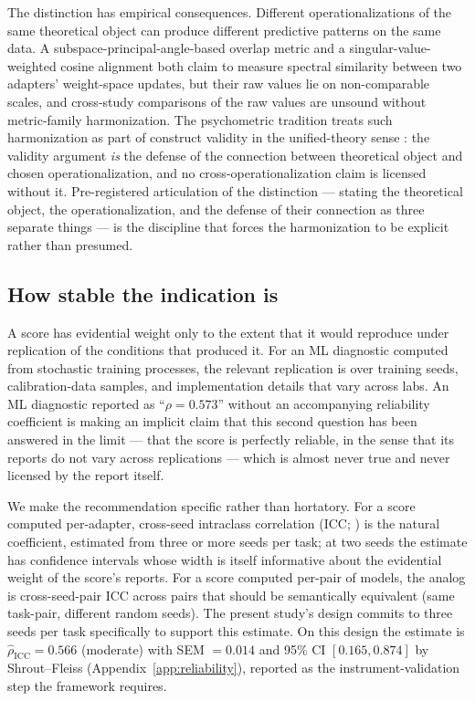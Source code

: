 \documentclass[10pt]{article}
\begin{document}
The distinction has empirical consequences. Different
operationalizations of the same theoretical object can produce
different predictive patterns on the same data.
A subspace-principal-angle-based overlap metric and a
singular-value-weighted cosine alignment both claim to measure
spectral similarity between two adapters' weight-space updates, but
their raw values lie on non-comparable scales, and cross-study
comparisons of the raw values are unsound without metric-family
harmonization. The psychometric tradition treats such harmonization
as part of construct validity in the unified-theory sense
\citep{messick1989validity}: the validity argument \emph{is} the
defense of the connection between theoretical object and chosen
operationalization, and no cross-operationalization claim is
licensed without it. Pre-registered articulation of the distinction
--- stating the theoretical object, the operationalization, and the
defense of their connection as three separate things --- is the
discipline that forces the harmonization to be explicit rather than
presumed.

\subsection{How stable the indication is}
\label{sec:framework-reliability}

A score has evidential weight only to the extent that it would
reproduce under replication of the conditions that produced it. For
an ML diagnostic computed from stochastic training processes, the
relevant replication is over training seeds, calibration-data
samples, and implementation details that vary across labs. An ML
diagnostic reported as ``$\rho = 0.573$'' without an accompanying
reliability coefficient is making an implicit claim that this second
question has been answered in the limit --- that the score is
perfectly reliable, in the sense that its reports do not vary across
replications --- which is almost never true and never licensed by
the report itself.

We make the recommendation specific rather than hortatory. For a
score computed per-adapter, cross-seed intraclass correlation
(ICC; \citealp{shrout1979icc}) is the natural coefficient, estimated
from three or more seeds per task; at two seeds the estimate has
confidence intervals whose width is itself informative about the
evidential weight of the score's reports. For a score computed
per-pair of models, the analog is cross-seed-pair ICC across pairs
that should be semantically equivalent (same task-pair, different
random seeds).
The present study's design commits to three seeds per task
specifically to support this estimate. On this design the estimate
is $\hat{\rho}_{\mathrm{ICC}} = 0.566$ (moderate) with SEM $= 0.014$
and 95\% CI $[0.165, 0.874]$ by Shrout--Fleiss
(Appendix~\ref{app:reliability}), reported as the
instrument-validation step the framework requires.
\end{document}
